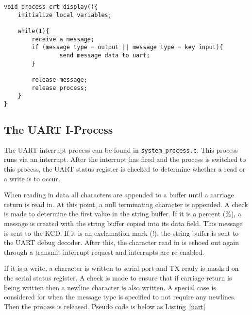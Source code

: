 \documentclass[oneside]{article}
\begin{document}
\begin{lstlisting}
void process_crt_display(){
    initialize local variables;

    while(1){
        receive a message;
        if (message type = output || message type = key input){
                send message data to uart;
        }
        
        release message;
        release process;
    }
}
\end{lstlisting}

\subsection*{The UART I-Process}
The UART interrupt process can be found in \texttt{system\_process.c}. This
process runs via an interrupt. After the interrupt has fired and the process is
switched to this process, the UART status register is checked to determine
whether a read or a write is to occur. 

When reading in data all characters are appended to a buffer until a carriage
return is read in. At this point, a null terminating character is appended.  A
check is made to determine the first value in the string buffer. If it is a
percent (\%), a message is created with the string buffer copied into its data
field. This message is sent to the KCD. If it is an exclamation mark (!), the
string buffer is sent to the UART debug decoder. After this, the character read
in is echoed out again through a transmit interrupt request and interrupts are
re-enabled. 

If it is a write, a character is written to serial port and TX ready is masked
on the serial status register.  A check is made to ensure that if carriage
return is being written then a newline character is also written. A special
case is considered for when the message type is specified to not require any
newlines. Then the process is released. Pseudo code is below as
Listing~\ref{uart}
\end{document}

